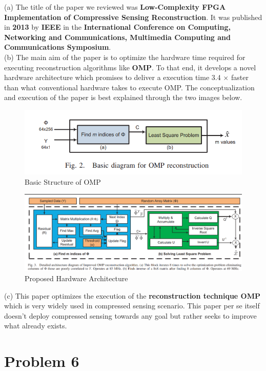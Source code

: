 \documentclass[a4paper,11pt]{article}
\numberwithin{definition}{section}
\numberwithin{mytheorem}{subsection}
\begin{document}
(a) The title of the paper we reviewed was \textbf{Low-Complexity FPGA Implementation of
Compressive Sensing Reconstruction}. It was published in \textbf{2013} by \textbf{IEEE} in the \textbf{International Conference on Computing, Networking and Communications, Multimedia Computing and Communications
Symposium}.\\
(b) The main aim of the paper is to optimize the hardware time required for executing reconstruction algorithms like \textbf{OMP}. To that end, it develops a novel hardware architecture which promises to deliver a execution time 3.4 $\times$ faster than what conventional hardware takes to execute OMP. The conceptualization and execution of the paper is best explained through the two images below.\\
\begin{figure}
    \begin{center}
        \includegraphics[scale=0.5]{Basic Structure of OMP.png}
        \caption{Basic Structure of OMP}
    \end{center}
\end{figure}

\begin{figure}
    \begin{center}
        \includegraphics[scale=0.5]{Proposed HArdware Architecture.png}
        \caption{Proposed Hardware Architecture}
    \end{center}
\end{figure}
(c) This paper optimizes the execution of the \textbf{reconstruction technique OMP} which is very widely used in compressed sensing scenario. This paper per se itself doesn't deploy compressed sensing towards any goal but rather seeks to improve what already exists. 




\newpage

\section{Problem 6}
\end{document}
